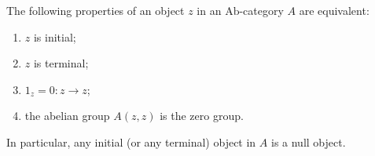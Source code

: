 The following properties of an object $z$ in an $\text{Ab}$-category $A$ are equivalent:

\begin{enumerate}
\item[(i)] $z$ is initial;
\item[(ii)] $z$ is terminal;
\item[(iii)] $1_z = 0 : z \rightarrow z$;
\item[(iv)] the abelian group $A(z,z)$ is the zero group.
\end{enumerate}

In particular, any initial (or any terminal) object in $A$ is a null object.
